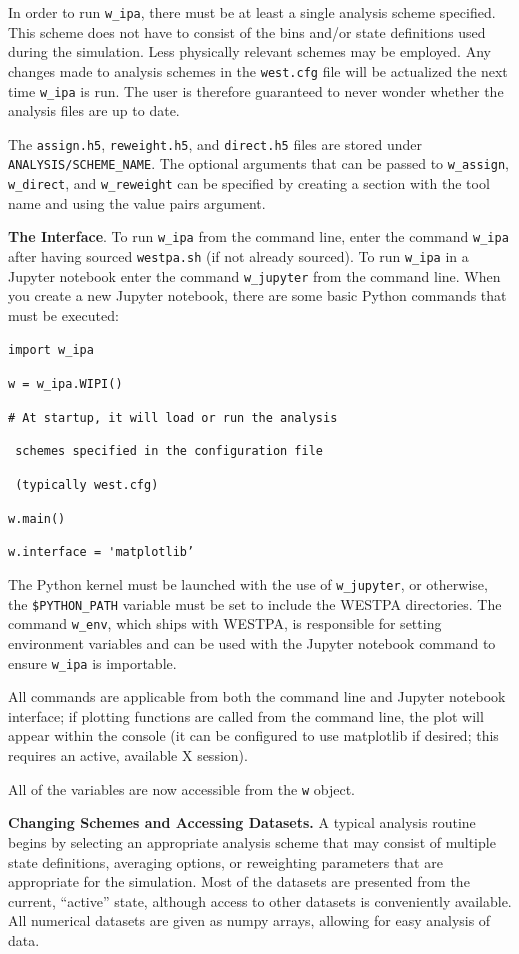 \documentclass[9pt,tutorial,pubversion]{livecoms}
\begin{document}
In order to run \verb|w_ipa|, there must be at least a single analysis scheme specified. 
This scheme does not have to consist of the bins and/or state definitions used during the simulation. 
Less physically relevant schemes may be employed. 
Any changes made to analysis schemes in the \verb|west.cfg| file will be actualized the next time \verb|w_ipa| is run. 
The user is therefore guaranteed to never wonder whether the analysis files are up to date. 

The \verb|assign.h5|, \verb|reweight.h5|, and \verb|direct.h5| files are stored under \verb|ANALYSIS/SCHEME_NAME|.
The optional arguments that can be passed to \verb|w_assign|, \verb|w_direct|, and \verb|w_reweight| can be specified by creating a section with the tool name and using the value pairs argument. 

\textbf{The Interface}. To run \verb|w_ipa| from the command line, enter the command \verb|w_ipa| after having sourced \verb|westpa.sh| (if not already sourced). 
To run \verb|w_ipa| in a Jupyter notebook enter the command \verb|w_jupyter| from the command line. 
When you create a new Jupyter notebook, there are some basic Python commands that must be executed:

\verb|import w_ipa|

\verb|w = w_ipa.WIPI()|

\verb|# At startup, it will load or run the analysis|

\verb| schemes specified in the configuration file|

\verb| (typically west.cfg)|

\verb|w.main()|

\verb|w.interface = 'matplotlib’|

The Python kernel must be launched with the use of \verb|w_jupyter|, or otherwise, the \verb|$PYTHON_PATH| variable must be set to include the WESTPA directories. 
The command \verb|w_env|, which ships with WESTPA, is responsible for setting environment variables and can be used with the Jupyter notebook command to ensure \verb|w_ipa| is importable.

All commands are applicable from both the command line and Jupyter notebook interface; if plotting functions are called from the command line, the plot will appear within the console (it can be configured to use matplotlib if desired; this requires an active, available X session).

All of the variables are now accessible from the \verb|w| object.

\textbf{Changing Schemes and Accessing Datasets.} A typical analysis routine begins by selecting an appropriate analysis scheme that may consist of multiple state definitions, averaging options, or reweighting parameters that are appropriate for the simulation. 
Most of the datasets are presented from the current, “active” state, although access to other datasets is conveniently available. 
All numerical datasets are given as numpy arrays, allowing for easy analysis of data.
\end{document}
